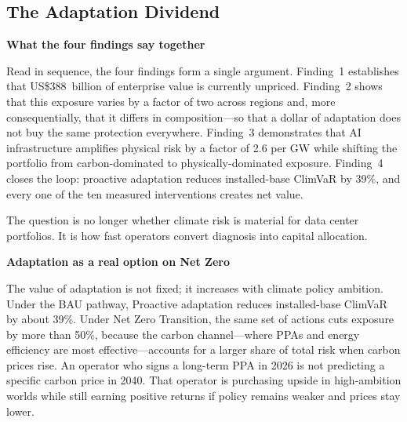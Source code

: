 
\clearpage\thispagestyle{chapterstart}

\subsection*{The Adaptation Dividend}
\greensep

\begin{twocolbody}

{\color{SEGreen}\textbf{What the four findings say together}}

\vspace{1mm}

\noindent Read in sequence, the four findings form a single argument. Finding~1 establishes that US\$388~billion of enterprise value is currently unpriced. Finding~2 shows that this exposure varies by a factor of two across regions and, more consequentially, that it differs in composition---so that a dollar of adaptation does not buy the same protection everywhere. Finding~3 demonstrates that AI infrastructure amplifies physical risk by a factor of 2.6 per GW while shifting the portfolio from carbon-dominated to physically-dominated exposure. Finding~4 closes the loop: proactive adaptation reduces installed-base ClimVaR by 39\%, and every one of the ten measured interventions creates net value.

The question is no longer whether climate risk is material for data center portfolios. It is how fast operators convert diagnosis into capital allocation.

\vspace{2.5mm}

{\color{SEGreen}\textbf{Adaptation as a real option on Net Zero}}

\vspace{1mm}

\noindent The value of adaptation is not fixed; it increases with climate policy ambition. Under the BAU pathway, Proactive adaptation reduces installed-base ClimVaR by about 39\%. Under Net Zero Transition, the same set of actions cuts exposure by more than 50\%, because the carbon channel---where PPAs and energy efficiency are most effective---accounts for a larger share of total risk when carbon prices rise. An operator who signs a long-term PPA in 2026 is not predicting a specific carbon price in 2040. That operator is purchasing upside in high-ambition worlds while still earning positive returns if policy remains weaker and prices stay lower.


\end{twocolbody}
